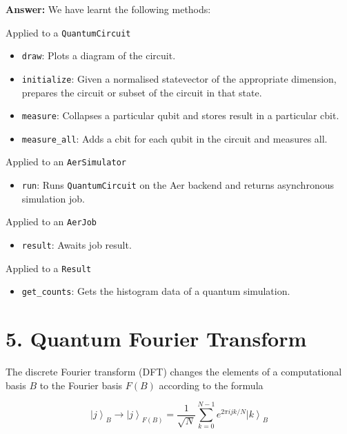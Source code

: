 \documentclass[11pt,dvipsnames]{article}
\begin{document}
    \textbf{Answer:} We have learnt the following methods:

Applied to a \texttt{QuantumCircuit} 

\begin{itemize}
    \item \texttt{draw}: Plots a diagram of
    the circuit. 
    \item \texttt{initialize}: Given a normalised statevector of
    the appropriate dimension, prepares the circuit or subset of the circuit
    in that state. 
    \item \texttt{measure}: Collapses a particular qubit and
    stores result in a particular cbit. 
    \item \texttt{measure\_all}: Adds a cbit
    for each qubit in the circuit and measures all.
\end{itemize}

Applied to an \texttt{AerSimulator} 

\begin{itemize}
    \item  \texttt{run}: Runs \texttt{QuantumCircuit} on the Aer backend and returns 
    asynchronous simulation job.
\end{itemize}

Applied to an \texttt{AerJob} 

\begin{itemize}
    \item \texttt{result}: Awaits job result.
\end{itemize}

Applied to a \texttt{Result} 

\begin{itemize}
    \item \texttt{get\_counts}: Gets the histogram
    data of a quantum simulation.
\end{itemize}

    \section*{5. Quantum Fourier Transform}\label{quantum-fourier-transform}

    The discrete Fourier transform (DFT) changes the elements of a
computational basis \(B\) to the Fourier basis \(F(B)\) according to the
formula

\[
\left|j\right\rangle_{B}\rightarrow \left|j\right\rangle_{F(B)} =  \frac{1}{\sqrt{N}}\sum^{N-1}_{k=0} e^{2\pi i j k /N}\left|k\right\rangle_{B}
\]
\end{document}
